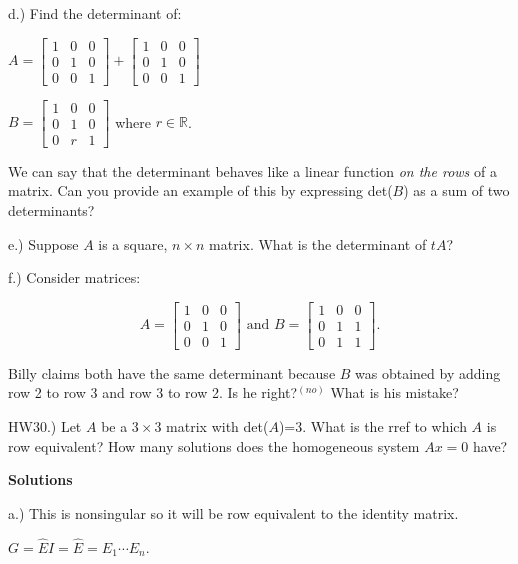 \documentclass{article}
\begin{document}
\medskip

d.) Find the determinant of:

$A = \left[\begin{array}{ccc}
1 & 0 &  0\\
0 & 1 & 0\\
0 & 0 & 1
\end{array}\right] + \left[\begin{array}{ccc}
1 & 0 &  0\\
0 & 1 & 0\\
0 & 0 & 1
\end{array}\right]$

$B = \left[\begin{array}{ccc}
1 & 0 &  0\\
0 & 1 & 0\\
0 & r & 1
\end{array}\right]$ where $r\in \mathbb{R}$.


We can say that the determinant behaves like a linear function \emph{on the rows} of a matrix. Can you provide an example of this by expressing det($B$) as a sum of two determinants?

e.) Suppose $A$ is a square, $n\times n$ matrix. What is the determinant of $tA$? 


f.) Consider matrices: 

$$A = \left[\begin{array}{ccc}
1 & 0 &  0\\
0 & 1 & 0\\
0 & 0 & 1
\end{array}\right] \text{ and } B=\left[\begin{array}{ccc}
1 & 0 &  0\\
0 & 1 & 1\\
0 & 1 & 1
\end{array}\right].$$

Billy claims both have the same determinant because $B$ was obtained by adding row 2 to row 3 and row 3 to row 2. Is he right?$^{(no)}$ What is his mistake?

HW30.) Let $A$ be a $3\times 3$ matrix with det($A$)=3. What is the rref to which $A$ is row equivalent? How many solutions does the homogeneous system $Ax=0$ have?

\pagebreak{}

\textbf{Solutions}

a.) This is nonsingular so it will be row equivalent to the identity matrix. 

$G=\hat{E}I = \hat{E}=E_1\cdots E_n.$
\end{document}
